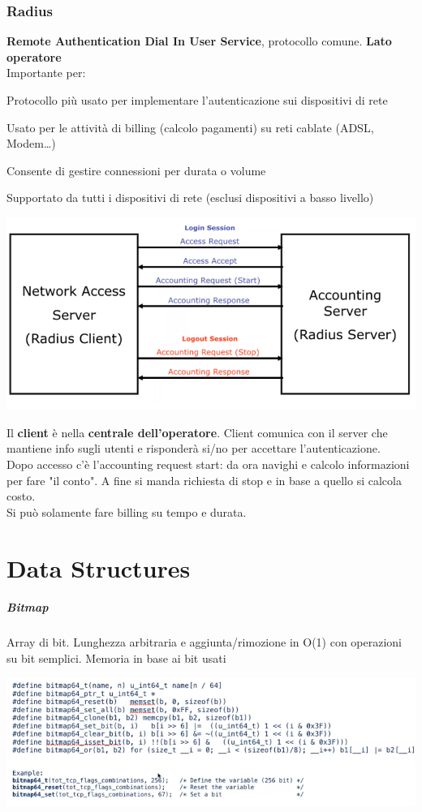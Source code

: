 \documentclass[10pt]{book}
\begin{document}
\subsection{Radius} \textbf{Remote Authentication Dial In User Service}, protocollo comune. \textbf{Lato operatore}\\
Importante per:
\begin{list}{}{}
	\item Protocollo più usato per implementare l'autenticazione sui dispositivi di rete
	\item Usato per le attività di billing (calcolo pagamenti) su reti cablate (ADSL, Modem\ldots)
	\item Consente di gestire connessioni per durata o volume
	\item Supportato da tutti i dispositivi di rete (esclusi dispositivi a basso livello)
\end{list}
\begin{center}
	\includegraphics[scale=0.75]{radius.png}
\end{center}
Il \textbf{client} è nella \textbf{centrale dell'operatore}. Client comunica con il server che mantiene info sugli utenti e risponderà si/no per accettare l'autenticazione.\\
Dopo accesso c'è l'accounting request start: da ora navighi e calcolo informazioni per fare "il conto". A fine si manda richiesta di stop e in base a quello si calcola  costo.\\
Si può solamente fare billing su tempo e durata.
\chapter{Data Structures}
\paragraph{Bitmap} Array di bit. Lunghezza arbitraria e aggiunta/rimozione in O(1) con operazioni su bit semplici. Memoria in base ai bit usati
\begin{center}
	\includegraphics[scale=0.75]{bitmap.png}
\end{center}
\end{document}
